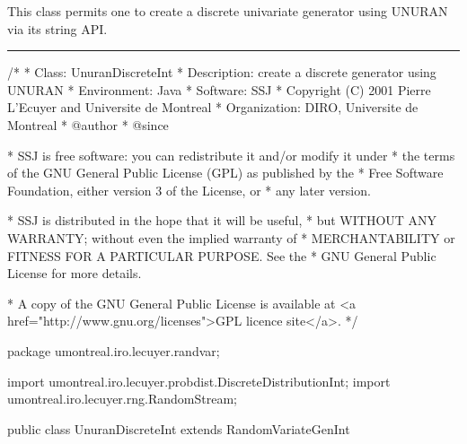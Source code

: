 
This class permits one to create a discrete univariate
generator using UNURAN via its string API.

\bigskip\hrule

\begin{code}
\begin{hide}
/*
 * Class:        UnuranDiscreteInt
 * Description:  create a discrete generator using UNURAN
 * Environment:  Java
 * Software:     SSJ 
 * Copyright (C) 2001  Pierre L'Ecuyer and Universite de Montreal
 * Organization: DIRO, Universite de Montreal
 * @author       
 * @since

 * SSJ is free software: you can redistribute it and/or modify it under
 * the terms of the GNU General Public License (GPL) as published by the
 * Free Software Foundation, either version 3 of the License, or
 * any later version.

 * SSJ is distributed in the hope that it will be useful,
 * but WITHOUT ANY WARRANTY; without even the implied warranty of
 * MERCHANTABILITY or FITNESS FOR A PARTICULAR PURPOSE.  See the
 * GNU General Public License for more details.

 * A copy of the GNU General Public License is available at
   <a href="http://www.gnu.org/licenses">GPL licence site</a>.
 */
\end{hide}
package umontreal.iro.lecuyer.randvar;\begin{hide}
import umontreal.iro.lecuyer.probdist.DiscreteDistributionInt;
import umontreal.iro.lecuyer.rng.RandomStream;
\end{hide}

public class UnuranDiscreteInt extends RandomVariateGenInt\begin{hide} {

   private RandUnuran unuran = new RandUnuran();
\end{hide}\end{code}

